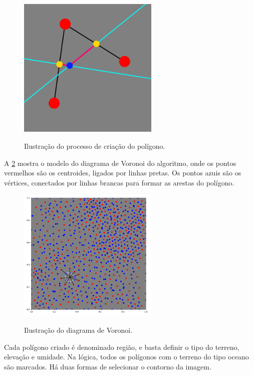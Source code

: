 \begin{figure}[!ht]
\centering
\caption{Ilustração do processo de criação do polígono.}
\includegraphics[width=0.6\textwidth]{figures/explicacao_vertice.png}
\label{fig:explicacao_vertice}
\end{figure}

A \cref{fig:diagrama_voronoi_pontos} mostra o modelo do diagrama de Voronoi do algoritmo, onde os pontos vermelhos são os centroides, ligados por linhas pretas. Os pontos azuis são os vértices, conectados por linhas brancas para formar as arestas do polígono.

\begin{figure}[!ht]
\centering
\caption{Ilustração do diagrama de Voronoi.}
\includegraphics[width=0.6\textwidth]{figures/diagrama_voronoi_pontos.png}
\label{fig:diagrama_voronoi_pontos}
\end{figure}

Cada polígono criado é denominado região, e basta definir o tipo do terreno, elevação e umidade. Na lógica, todos os polígonos com o terreno do tipo oceano são marcados. Há duas formas de selecionar o contorno da imagem.

